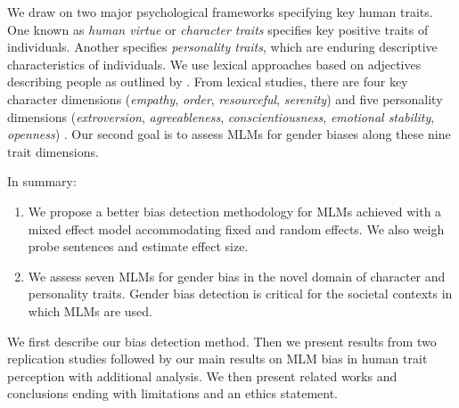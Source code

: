 We draw on two major psychological frameworks specifying key human traits. One known as \textit{human virtue} or \textit{character traits}
\cite{peterson2004character} specifies key positive traits of individuals. Another specifies \textit{personality traits}, which are enduring descriptive characteristics of individuals. 
%
We use lexical approaches based on adjectives describing people as outlined by \citet{john1988lexical}.
%
From lexical studies, there are four key character dimensions (\textit{empathy}, \textit{order}, \textit{resourceful}, \textit{serenity}) \cite{cawley2000virtues} and five personality dimensions (\textit{extroversion}, \textit{agreeableness}, \textit{conscientiousness}, \textit{emotional stability}, \textit{openness}) \cite{goldberg1992development}.
%
Our second goal is to assess MLMs for gender biases along these nine trait dimensions.

\noindent In summary:
\begin{enumerate}
    \item We propose a better bias detection methodology for MLMs achieved with a mixed effect model accommodating fixed and random effects.  We also weigh probe sentences and estimate effect size.

    \item We assess seven MLMs for gender bias in the novel domain of character and personality traits. Gender bias detection is critical for the societal contexts in which MLMs are used.

\end{enumerate}

We first describe our bias detection method. Then we present results from two replication studies followed by our main results on MLM bias in human trait perception with additional analysis. We then present related works and conclusions ending with limitations and an ethics statement.